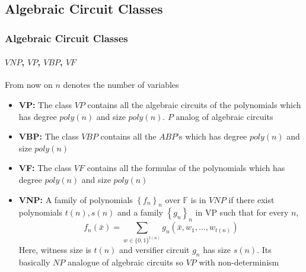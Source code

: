 \documentclass[10pt]{beamer}
\begin{document}
	
	
	
	


\subsection{Algebraic Circuit Classes}

\begin{frame}
	\frametitle{Algebraic Circuit Classes}
	\framesubtitle{$VNP$, $VP$, $VBP$, $VF$} %
 From now on $n$ denotes the number of variables
	\begin{itemize}
	    \item \textbf{VP:} The class $VP$ contains all the algebraic circuits of the polynomials which has degree $poly(n)$ and size $poly(n)$. $P$ analog of algebraic circuits 
     \item \textbf{VBP:} The class $VBP$ contains all the $ABP$'s which has degree $poly(n)$ and size $poly(n)$
     \item \textbf{VF:} The class $VF$ contains all the formulas of the polynomials which has degree $poly(n)$ and size $poly(n)$
     \item \textbf{VNP:} A family of polynomials $\left\{f_n\right\}_n$ over $\mathbb{F}$ is in $VNP$ if there exist polynomials $t(n), s(n)$ and a family $\left\{g_n\right\}_n$ in VP such that for every $n$, $$f_n(\bar{x})=\sum_{w \in\{0,1\}^{t(n)}} g_n\left(\bar{x}, w_1, \ldots, w_{t(n)}\right)$$ Here, witness size is $t(n)$ and versifier circuit $g_n$ has size $s(n)$. Its basically $NP$ analogue of algebraic circuits so $VP$ with non-determinism
	\end{itemize}
	
\end{frame}
\end{document}
